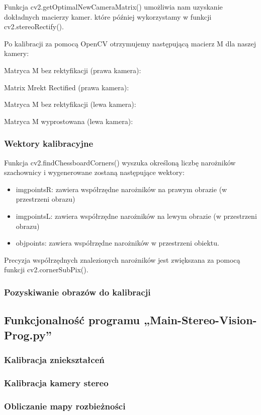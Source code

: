 \documentclass[magisterska]{pracadypl}
\begin{document}
Funkcja cv2.getOptimalNewCameraMatrix() umożliwia nam uzyskanie dokładnych macierzy kamer.
które później wykorzystamy w funkcji cv2.stereoRectify().

Po kalibracji za pomocą OpenCV otrzymujemy następującą macierz M dla naszej kamery:

Matryca M bez rektyfikacji (prawa kamera):

Matrix Mrekt Rectified (prawa kamera):

Matryca M bez rektyfikacji (lewa kamera):

Matryca M wyprostowana (lewa kamera):

\subsubsection{Wektory kalibracyjne}

Funkcja cv2.findChessboardCorners() wyszuka określoną liczbę narożników szachownicy
i wygenerowane zostaną następujące wektory:

\begin{itemize}
  \item imgpointsR: zawiera współrzędne narożników na prawym obrazie (w przestrzeni obrazu)
  \item imgpointsL: zawiera współrzędne narożników na lewym obrazie (w przestrzeni obrazu)
  \item objpoints: zawiera współrzędne narożników w przestrzeni obiektu.
\end{itemize}

Precyzja współrzędnych znalezionych narożników jest zwiększana za pomocą funkcji
cv2.cornerSubPix().

\subsubsection{Pozyskiwanie obrazów do kalibracji}
\subsection{Funkcjonalność programu „Main-Stereo-Vision-Prog.py”}
\subsubsection{Kalibracja zniekształceń}
\subsubsection{Kalibracja kamery stereo}
\subsubsection{Obliczanie mapy rozbieżności}
\end{document}
